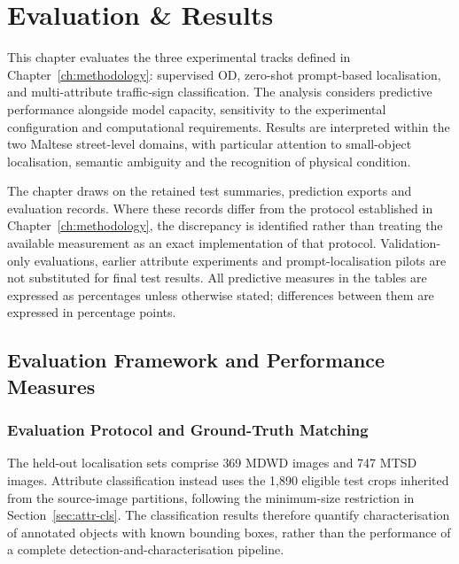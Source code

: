 \chapter{Evaluation \& Results}
\label{ch:evaluation}
This chapter evaluates the three experimental tracks defined in Chapter~\ref{ch:methodology}: supervised \gls{OD}, zero-shot prompt-based localisation, and multi-attribute traffic-sign classification. The analysis considers predictive performance alongside model capacity, sensitivity to the experimental configuration and computational requirements. Results are interpreted within the two Maltese street-level domains, with particular attention to small-object localisation, semantic ambiguity and the recognition of physical condition.

The chapter draws on the retained test summaries, prediction exports and evaluation records. Where these records differ from the protocol established in Chapter~\ref{ch:methodology}, the discrepancy is identified rather than treating the available measurement as an exact implementation of that protocol. Validation-only evaluations, earlier attribute experiments and prompt-localisation pilots are not substituted for final test results. All predictive measures in the tables are expressed as percentages unless otherwise stated; differences between them are expressed in percentage points.

\section{Evaluation Framework and Performance Measures}
\label{sec:ev-framework}
\subsection{Evaluation Protocol and Ground-Truth Matching}
\label{sec:ev-protocol}
The held-out localisation sets comprise 369 \gls{MDWD} images and 747 \gls{MTSD} images. Attribute classification instead uses the 1,890 eligible test crops inherited from the source-image partitions, following the minimum-size restriction in Section~\ref{sec:attr-cls}. The classification results therefore quantify characterisation of annotated objects with known bounding boxes, rather than the performance of a complete detection-and-characterisation pipeline.

